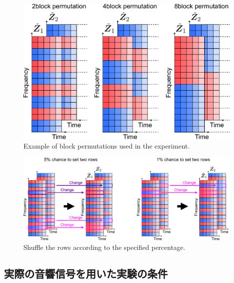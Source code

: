 \begin{figure}[t]
    \begin{center}
        \includegraphics[width=1.0\columnwidth]{figures/experiment_block_matrix.pdf}
    \end{center}
	\caption{Example of block permutations used in the experiment.}
	\label{fig:ex_block}
\end{figure}

\begin{figure}[t]
    \begin{center}
        \includegraphics[width=1.0\columnwidth]{figures/1ratio_5ratio_permutation.pdf}
    \end{center}
	\caption{Shuffle the rows according to the specified percentage.}
	\label{fig:1_5ratio_perm}
\end{figure}

\clearpage
\subsection{実際の音響信号を用いた実験の条件}
\label{sec:ex_condition_audio}

